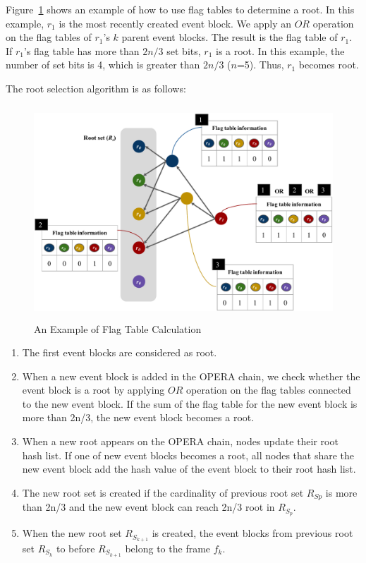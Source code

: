 \documentclass[preprint,12pt]{elsarticle}
\begin{document}
Figure~\ref{fig:ex_ft} shows an example of how to use flag tables to determine a root. In this example, $r_1$ is the most recently created event block. We apply an $OR$ operation on the flag tables of $r_1$'s $k$ parent event blocks. The result is the flag table of $r_1$.  If $r_1$'s flag table has more than $2n/3$ set bits, $r_1$ is a root. In this example, the number of set bits is 4, which is greater than $2n/3$ ($n$=5). Thus, $r_1$ becomes root. 


The root selection algorithm is as follows:

\begin{figure} [t] \centering  
   \includegraphics[height=8cm, width=1.0\columnwidth]{flagtable}
  \caption{An Example of Flag Table Calculation}
  \label{fig:ex_ft}
\end{figure}

\begin{enumerate}
    \item The first event blocks are considered as root. 
    \item When a new event block is added in the OPERA chain, we check whether the event block is a root by applying $OR$ operation on the flag tables connected to the new event block. If the sum of the flag table for the new event block is more than 2n/3, the new event block becomes a root. 
   \item When a new root appears on the OPERA chain, nodes update their root hash list. If one of new event blocks becomes a root, all nodes that share the new event block add the hash value of the event block to their root hash list.  
   \item The new root set is created if the cardinality of previous root set $R_{Sp}$ is more than 2n/3 and the new event block can reach 2n/3 root in $R_{S_p}$.
   \item When the new root set $R_{S_{k+1}}$ is created, the event blocks from previous root set $R_{S_k}$ to before $R_{S_{k+1}}$ belong to the frame $f_k$.
\end{enumerate}
\end{document}
